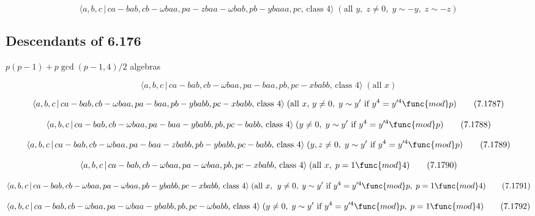 \documentclass[10pt]{article}
\begin{document}
\begin{equation}
\langle a,b,c\,|\,ca-bab,cb-\omega baa,pa-zbaa-\omega bab,pb-ybaaa,pc,\,%
\text{class }4\rangle \;(\text{all }y,\;z\neq 0,\;y\sim -y,\;z\sim -z) 
\tag{7.1785}
\end{equation}

\subsection{Descendants of 6.176}

$p(p-1)+p\gcd (p-1,4)/2$ algebras

\begin{equation}
\langle a,b,c\,|\,ca-bab,cb-\omega baa,pa-baa,pb,pc-xbabb,\,\text{class }%
4\rangle \;(\text{all }x)  \tag{7.1786}
\end{equation}

\begin{equation}
\langle a,b,c\,|\,ca-bab,cb-\omega baa,pa-baa,pb-ybabb,pc-xbabb,\,\text{%
class }4\rangle \;(\text{all }x,\,y\neq 0,\;y\sim y^{\prime }\text{ if }%
y^{4}=y^{\prime 4}\func{mod}p)  \tag{7.1787}
\end{equation}

\begin{equation}
\langle a,b,c\,|\,ca-bab,cb-\omega baa,pa-baa-ybabb,pb,pc-babb,\,\text{class 
}4\rangle \;(y\neq 0,\;y\sim y^{\prime }\text{ if }y^{4}=y^{\prime 4}\func{%
mod}p)  \tag{7.1788}
\end{equation}

\begin{equation}
\langle a,b,c\,|\,ca-bab,cb-\omega baa,pa-baa-zbabb,pb-ybabb,pc-babb,\,\text{%
class }4\rangle \;(y,z\neq 0,\;y\sim y^{\prime }\text{ if }y^{4}=y^{\prime 4}%
\func{mod}p)  \tag{7.1789}
\end{equation}

\begin{equation}
\langle a,b,c\,|\,ca-bab,cb-\omega baa,pa-\omega baa,pb,pc-xbabb,\,\text{%
class }4\rangle \;(\text{all }x,\;p=1\func{mod}4)  \tag{7.1790}
\end{equation}

\begin{equation}
\langle a,b,c\,|\,ca-bab,cb-\omega baa,pa-\omega baa,pb-ybabb,pc-xbabb,\,%
\text{class }4\rangle \;(\text{all }x,\;\,y\neq 0,\;y\sim y^{\prime }\text{
if }y^{4}=y^{\prime 4}\func{mod}p,\;p=1\func{mod}4)  \tag{7.1791}
\end{equation}

\begin{equation}
\langle a,b,c\,|\,ca-bab,cb-\omega baa,pa-\omega baa-ybabb,pb,pc-\omega
babb,\,\text{class }4\rangle \;(y\neq 0,\;y\sim y^{\prime }\text{ if }%
y^{4}=y^{\prime 4}\func{mod}p,\;p=1\func{mod}4)  \tag{7.1792}
\end{equation}
\end{document}
